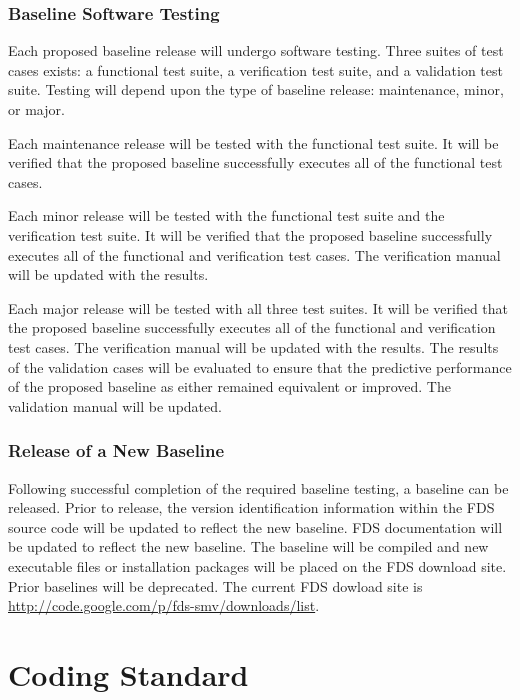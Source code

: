\documentclass[11pt]{book}
\begin{document}
\subsection{Baseline Software Testing}

Each proposed baseline release will undergo software testing.  Three suites of test cases exists: a functional test suite,
a verification test suite, and a validation test suite.  Testing will depend upon the type of baseline release: 
maintenance, minor, or major.

Each maintenance release will be tested with the functional test suite.  It will be verified that the proposed baseline
successfully executes all of the functional test cases.  

Each minor release will be tested with the functional test suite and the verification test suite.  It will be verified
that the proposed baseline successfully executes all of the functional and verification test cases.  The
verification manual will be updated with the results.

Each major release will be tested with all three test suites.    It will be verified
that the proposed baseline successfully executes all of the functional and verification test cases.  The verification
manual will be updated with the results.  The results of the validation cases will be evaluated to ensure that the
predictive performance of the proposed baseline as either remained equivalent or improved.  The validation manual will
be updated.

\subsection{Release of a New Baseline}

Following successful completion of the required baseline testing, a baseline can be released.  Prior to release, the 
version identification information within the FDS source code will be updated to reflect the new baseline.  FDS
documentation will be updated to reflect the new baseline.  The baseline will be compiled and new executable files 
or installation packages will be placed on the FDS download site.  Prior baselines will be deprecated.  The
current FDS dowload site is \href{http://code.google.com/p/fds-smv/downloads/list}
{{\ct http://code.google.com/p/fds-smv/downloads/list}}.

\chapter{Coding Standard}
\end{document}
